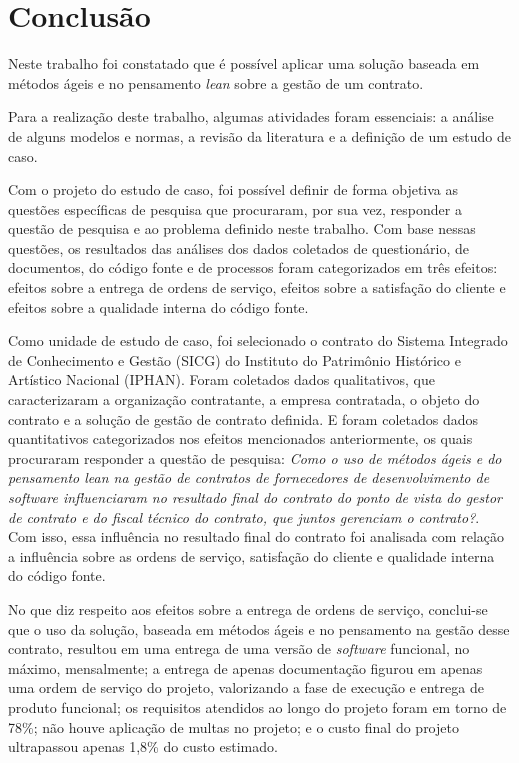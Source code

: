 \chapter[Conclusão]{Conclusão}

Neste trabalho foi constatado que é possível aplicar uma solução baseada em métodos ágeis e no pensamento \textit{lean} sobre a gestão de um contrato.
 
Para a realização deste trabalho, algumas atividades foram essenciais: a análise de alguns modelos e normas, a revisão da literatura e a definição de um estudo de caso.
 
Com o projeto do estudo de caso, foi possível definir de forma objetiva as questões específicas de pesquisa que procuraram, por sua vez, responder a questão de pesquisa e ao problema definido neste trabalho. Com base nessas questões, os resultados das análises dos dados coletados de questionário, de documentos, do código fonte e de processos foram categorizados em três efeitos: efeitos sobre a entrega de ordens de serviço, efeitos sobre a satisfação do cliente e efeitos sobre a qualidade interna do código fonte.
 
Como unidade de estudo de caso, foi selecionado o contrato do Sistema Integrado de Conhecimento e Gestão (SICG) do Instituto do Patrimônio Histórico e Artístico Nacional (IPHAN). Foram coletados dados qualitativos, que caracterizaram a organização contratante, a empresa contratada, o objeto do contrato e a solução de gestão de contrato definida. E foram coletados dados quantitativos categorizados nos efeitos mencionados anteriormente, os quais procuraram responder a questão de pesquisa: \textit{ Como o uso de métodos ágeis e do pensamento \textit{lean} na gestão de contratos de fornecedores de desenvolvimento de \textit{software} influenciaram no resultado final do contrato do ponto de vista do gestor de contrato e do fiscal técnico do contrato, que juntos gerenciam o contrato?}. Com isso, essa influência no resultado final do contrato foi analisada com relação a influência sobre as ordens de serviço, satisfação do cliente e qualidade interna do código fonte.

No que diz respeito aos efeitos sobre a entrega de ordens de serviço, conclui-se que o uso da solução, baseada em métodos ágeis e no pensamento na gestão desse contrato, resultou em uma entrega de uma versão de \textit{software} funcional, no máximo, mensalmente; a entrega de apenas documentação figurou em apenas uma ordem de serviço do projeto, valorizando a fase de execução e entrega de produto funcional; os requisitos atendidos ao longo do projeto foram em torno de 78\%; não houve aplicação de multas no projeto; e o custo final do projeto ultrapassou apenas 1,8\% do custo estimado.
 
